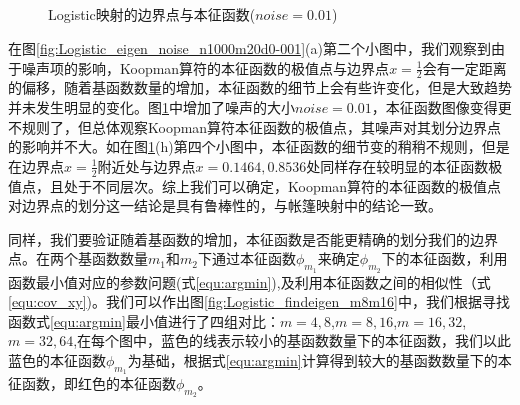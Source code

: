 \begin{figure}[!]
    \centering%
      \\
      \\
      \\
      \\
      \caption{Logistic映射的边界点与本征函数($noise=0.01$)}\label{fig:Logistic_eigen_noise_n1000m20d0-01}
\end{figure}

在图\ref{fig:Logistic_eigen_noise_n1000m20d0-001}(a)第二个小图中，我们观察到由于噪声项的影响，Koopman算符的本征函数的极值点与边界点$x=\frac{1}{2}$会有一定距离的偏移，随着基函数数量的增加，本征函数的细节上会有些许变化，但是大致趋势并未发生明显的变化。图\ref{fig:Logistic_eigen_noise_n1000m20d0-01}中增加了噪声的大小$noise=0.01$，本征函数图像变得更不规则了，但总体观察Koopman算符本征函数的极值点，其噪声对其划分边界点的影响并不大。如在图\ref{fig:Logistic_eigen_noise_n1000m20d0-01}(h)第四个小图中，本征函数的细节变的稍稍不规则，但是在边界点$x=\frac{1}{2}$附近处与边界点$x=0.1464,0.8536$处同样存在较明显的本征函数极值点，且处于不同层次。综上我们可以确定，Koopman算符的本征函数的极值点对边界点的划分这一结论是具有鲁棒性的，与帐篷映射中的结论一致。

同样，我们要验证随着基函数的增加，本征函数是否能更精确的划分我们的边界点。在两个基函数数量$m_1$和$m_2$下通过本征函数$\phi_{m_1}$来确定$\phi_{m_2}$下的本征函数，利用函数最小值对应的参数问题(式\ref{equ:argmin}),及利用本征函数之间的相似性（式\ref{equ:cov_xy})。我们可以作出图\ref{fig:Logistic_findeigen_m8m16}中，我们根据寻找函数式\ref{equ:argmin}最小值进行了四组对比：$m=4,8$,$m=8,16$,$m=16,32$,$m=32,64$,在每个图中，蓝色的线表示较小的基函数数量下的本征函数，我们以此蓝色的本征函数$\phi_{m_1}$为基础，根据式\ref{equ:argmin}计算得到较大的基函数数量下的本征函数，即红色的本征函数$\phi_{m_2}$。

